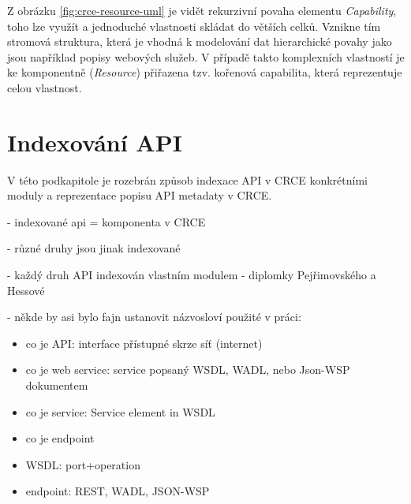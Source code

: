 \documentclass[czech,DP]{thesiskiv}
\begin{document}
Z obrázku \ref{fig:crce-resource-uml} je vidět rekurzivní povaha elementu \textit{Capability}, toho lze využít a jednoduché vlastnosti skládat do větších celků. Vznikne tím stromová struktura, která je vhodná k modelování dat hierarchické povahy jako jsou například popisy webových služeb. V případě takto komplexních vlastností je ke komponentně (\textit{Resource}) přiřazena tzv. kořenová capabilita, která reprezentuje celou vlastnost.


\section{Indexování API}
\label{sec:api-index}

V této podkapitole je rozebrán způsob indexace API v CRCE konkrétními moduly a reprezentace popisu API metadaty v CRCE. 

- indexované api = komponenta v CRCE

- různé druhy jsou jinak indexované

- každý druh API indexován vlastním modulem - diplomky Pejřimovského \cite{pejrimovsky2015ws} a Hessové \cite{hessova2015rest}

- někde by asi bylo fajn ustanovit názvosloví použité v práci:
\begin{itemize}
	\item co je API: interface přístupné skrze síť (internet)
	\item co je web service: service popsaný WSDL, WADL, nebo Json-WSP dokumentem
	\item co je service: Service element in WSDL
	\item co je endpoint
	\item WSDL: port+operation
	\item endpoint: REST, WADL, JSON-WSP
\end{itemize}
\end{document}
